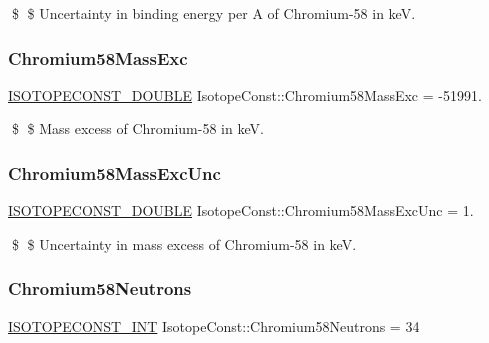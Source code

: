 \$ \$ Uncertainty in binding energy per A of Chromium-\/58 in keV. \mbox{\label{group___isotope_const-_chromium-_cr58_ga3df30bc68d2711be6806d3123508c073}} 
\subsubsection{\texorpdfstring{Chromium58\+Mass\+Exc}{Chromium58MassExc}}
{\footnotesize\ttfamily \mbox{\hyperlink{group___isotope_const-_macros_ga8f45a7272ce02c0b4c65c44636ed719a}{I\+S\+O\+T\+O\+P\+E\+C\+O\+N\+S\+T\+\_\+\+D\+O\+U\+B\+LE}} Isotope\+Const\+::\+Chromium58\+Mass\+Exc = -\/51991.}

\$ \$ Mass excess of Chromium-\/58 in keV. \mbox{\label{group___isotope_const-_chromium-_cr58_gac633161f515541783e885ace272b4864}} 
\subsubsection{\texorpdfstring{Chromium58\+Mass\+Exc\+Unc}{Chromium58MassExcUnc}}
{\footnotesize\ttfamily \mbox{\hyperlink{group___isotope_const-_macros_ga8f45a7272ce02c0b4c65c44636ed719a}{I\+S\+O\+T\+O\+P\+E\+C\+O\+N\+S\+T\+\_\+\+D\+O\+U\+B\+LE}} Isotope\+Const\+::\+Chromium58\+Mass\+Exc\+Unc = 1.}

\$ \$ Uncertainty in mass excess of Chromium-\/58 in keV. \mbox{\label{group___isotope_const-_chromium-_cr58_gadfe53be9bf0c2798c98c675b7ad7b5e9}} 
\subsubsection{\texorpdfstring{Chromium58\+Neutrons}{Chromium58Neutrons}}
{\footnotesize\ttfamily \mbox{\hyperlink{group___isotope_const-_macros_ga5f18360b3e99483a35c32d789e62621c}{I\+S\+O\+T\+O\+P\+E\+C\+O\+N\+S\+T\+\_\+\+I\+NT}} Isotope\+Const\+::\+Chromium58\+Neutrons = 34}


